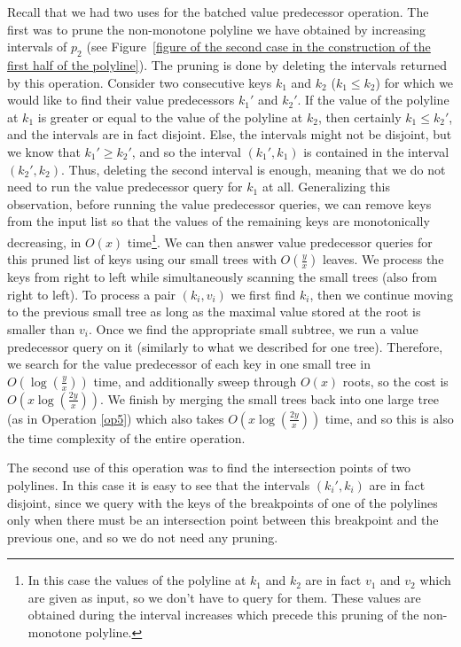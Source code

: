 \documentclass[a4paper,UKenglish]{lipics-v2016}
\theoremstyle{plain}
\begin{document}
Recall that we had two uses for the batched value predecessor operation. The first was to prune the non-monotone polyline we have obtained by increasing intervals of $p_2$ (see Figure~\ref{figure of the second case in the construction of the first half of the polyline}). The pruning is done by deleting the intervals returned by this operation.
%
Consider two consecutive keys $k_1$ and $k_2$ ($k_1 \leq k_2$) for which we would like to find their value predecessors $k_1'$ and $k_2'$. If the value of the polyline at $k_1$  is greater or equal to the value  of the polyline at $k_2$, then certainly $k_1 \leq k_2'$, and the intervals are in fact disjoint. Else, the intervals might not be disjoint, but we know that $k_1' \geq k_2'$, and so the interval $(k_1',k_1)$ is contained in the interval $(k_2',k_2)$. Thus, deleting the second interval is enough, meaning that we do not need to run the value predecessor query for $k_1$ at all. Generalizing this observation, before running the value predecessor queries, we can remove keys from the input list
so that the values of the remaining keys are  monotonically decreasing, in $O(x)$ time\footnote{In this case the values of the polyline at $k_1$ and $k_2$ are in fact $v_1$ and $v_2$ which are given as input, so we don't have to query for them. These values are obtained during the interval increases which precede this pruning of the non-monotone polyline.}. 
We can then answer value predecessor queries for this pruned list of keys using our small trees with $O(\frac{y}{x})$ leaves. We process the keys from right to left while simultaneously scanning the small trees (also from right to left). To process a pair $(k_{i},v_{i})$ we first find $k_{i}$, then we continue moving to the previous small tree as long as the maximal value stored at the root is smaller than $v_{i}$. Once we find the appropriate small subtree, we run a value predecessor query on it (similarly to what we described for one tree). 
%
Therefore, we search for the value predecessor of each key in one small tree in $O(\log(\frac{y}{x}))$ time,
and additionally sweep through $O(x)$ roots, so the cost is $O(x \log (\frac{2y}{x}))$. We finish by merging the small trees back into one large tree (as in Operation \ref{op5}) which also takes $O(x \log (\frac{2y}{x}))$ time, and so this is also the time complexity of the entire operation.

The second use of this operation was to find the intersection points of two polylines. In this case it is easy to see that the intervals $(k_i',k_i)$ are in fact disjoint, since we query with the keys of the breakpoints of one of the polylines only when there must be an intersection point between this breakpoint and the previous one, and so we do not need any pruning.
\end{document}
